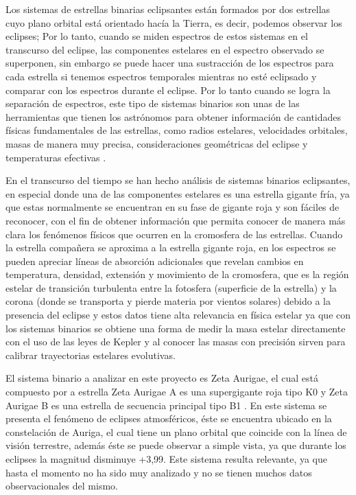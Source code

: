 \documentclass[11pt]{article}
\begin{document}
\noindent Los sistemas de estrellas binarias eclipsantes están formados por dos estrellas cuyo plano orbital está orientado hacía la Tierra, es decir, podemos observar los eclipses; Por lo tanto, cuando se miden espectros de estos sistemas en el transcurso del eclipse, las componentes estelares en el espectro observado se superponen, sin embargo se puede hacer una sustracción de los espectros para cada estrella si tenemos espectros temporales mientras no esté eclipsado y comparar con los espectros durante el eclipse. Por lo tanto cuando se logra la separación de espectros, este tipo de sistemas binarios son unas de las herramientas que tienen los astrónomos para obtener información de cantidades físicas fundamentales de las estrellas, como radios estelares, velocidades orbitales, masas de manera muy precisa, consideraciones geométricas del eclipse y temperaturas efectivas \cite{schroder2009stars}.
\vspace{2mm}

\noindent En el transcurso del tiempo se han hecho análisis de sistemas binarios eclipsantes, en especial donde una de las componentes estelares es una estrella gigante fría, ya que estas normalmente se encuentran en su fase de gigante roja y son fáciles de reconocer, con el fin de obtener información que permita conocer de manera más clara los fenómenos físicos que ocurren en la cromosfera de las estrellas. Cuando la estrella compañera se aproxima a la estrella gigante roja, en los espectros se pueden apreciar líneas de absorción adicionales que revelan cambios en temperatura, densidad, extensión y movimiento de la cromosfera, que es la región estelar de transición turbulenta entre la fotosfera (superficie de la estrella) y la corona (donde se transporta y pierde materia por vientos solares) debido a la presencia del eclipse y estos datos tiene alta relevancia en física estelar ya que con los sistemas binarios se obtiene una forma de medir la masa estelar directamente con el uso de las leyes de Kepler y al conocer las masas con precisión sirven para calibrar trayectorias estelares evolutivas.

\noindent El sistema binario a analizar en este proyecto es Zeta Aurigae, el cual está compuesto por a estrella Zeta Aurigae A es una supergigante roja tipo K0 y Zeta Aurigae B es una estrella de secuencia principal tipo B1 \cite{kps9}. En este sistema se presenta el fenómeno de eclipses atmosféricos, éste se encuentra ubicado en la constelación de Auriga, el cual tiene un plano orbital que coincide con la línea de visión terrestre, además éste se puede observar a simple vista, ya que durante los eclipses la magnitud disminuye +3,99. Este sistema resulta relevante, ya que hasta el momento no ha sido muy analizado y no se tienen muchos datos observacionales del mismo.
\vspace{2mm}
\end{document}
